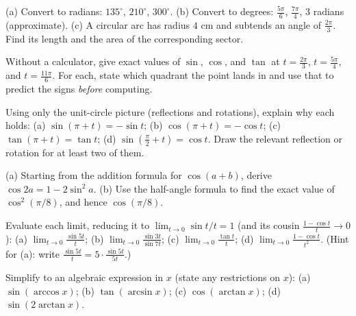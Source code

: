 \begin{exercise}
(a) Convert to radians: $135^\circ$, $210^\circ$, $300^\circ$.
(b) Convert to degrees: $\tfrac{5\pi}{6}$, $\tfrac{7\pi}{4}$, $3$ radians (approximate).
(c) A circular arc has radius $4$ cm and subtends an angle of $\tfrac{2\pi}{3}$. Find its length and the area of the corresponding sector.
\end{exercise}

\begin{exercise}
Without a calculator, give exact values of $\sin$, $\cos$, and $\tan$ at $t = \tfrac{2\pi}{3}$, $t = \tfrac{5\pi}{4}$, and $t = \tfrac{11\pi}{6}$. For each, state which quadrant the point lands in and use that to predict the signs \emph{before} computing.
\end{exercise}

\begin{exercise}
Using only the unit-circle picture (reflections and rotations), explain why each holds:
(a) $\sin(\pi + t) = -\sin t$;\quad
(b) $\cos(\pi + t) = -\cos t$;\quad
(c) $\tan(\pi + t) = \tan t$;\quad
(d) $\sin(\tfrac{\pi}{2} + t) = \cos t$. Draw the relevant reflection or rotation for at least two of them.
\end{exercise}

\begin{exercise}
(a) Starting from the addition formula for $\cos(a+b)$, derive $\cos 2a = 1 - 2\sin^2 a$.
(b) Use the half-angle formula to find the exact value of $\cos^2(\pi/8)$, and hence $\cos(\pi/8)$.
\end{exercise}

\begin{exercise}
Evaluate each limit, reducing it to $\lim_{t\to0}\sin t/t = 1$ (and its cousin $\tfrac{1-\cos t}{t}\to 0$):
(a) $\displaystyle\lim_{t\to 0}\frac{\sin 5t}{t}$;\quad
(b) $\displaystyle\lim_{t\to 0}\frac{\sin 3t}{\sin 7t}$;\quad
(c) $\displaystyle\lim_{t\to 0}\frac{\tan t}{t}$;\quad
(d) $\displaystyle\lim_{t\to 0}\frac{1 - \cos t}{t^2}$.
(Hint for (a): write $\tfrac{\sin 5t}{t} = 5\cdot\tfrac{\sin 5t}{5t}$.)
\end{exercise}

\begin{exercise}
Simplify to an algebraic expression in $x$ (state any restrictions on $x$):
(a) $\sin(\arccos x)$;\quad
(b) $\tan(\arcsin x)$;\quad
(c) $\cos(\arctan x)$;\quad
(d) $\sin(2\arctan x)$.
\end{exercise}

